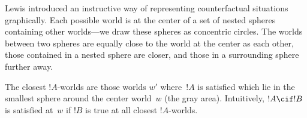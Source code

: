 \documentclass[../../../include/open-logic-section]{subfiles}
\begin{document}
Lewis introduced an instructive way of representing counterfactual
situations graphically. Each possible world is at the center of a set
of nested spheres containing other worlds---we draw these spheres as
concentric circles. The worlds between two spheres are equally close
to the world at the center as each other, those contained in a nested
sphere are closer, and those in a surrounding sphere further away.
\begin{center}
\end{center}
The closest $!A$-worlds are those worlds $w'$ where~$!A$ is satisfied
which lie in the smallest sphere around the center world~$w$ (the gray
area). Intuitively, $!A \cif !B$ is satisfied at~$w$ if $!B$ is true
at all closest $!A$-worlds.
\end{document}
